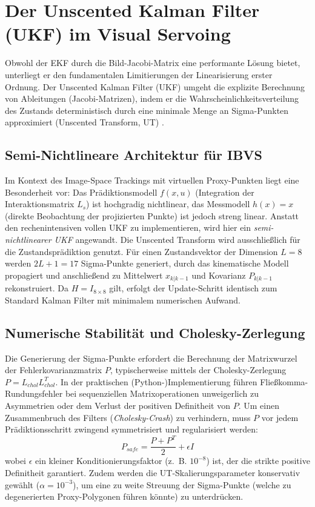 \documentclass{article}
\begin{document}
\section{Der Unscented Kalman Filter (UKF) im Visual Servoing}
\label{sec:ukf}

Obwohl der EKF durch die Bild-Jacobi-Matrix eine performante Lösung bietet, unterliegt er den fundamentalen Limitierungen der Linearisierung erster Ordnung. Der Unscented Kalman Filter (UKF) umgeht die explizite Berechnung von Ableitungen (Jacobi-Matrizen), indem er die Wahrscheinlichkeitsverteilung des Zustands deterministisch durch eine minimale Menge an Sigma-Punkten approximiert (Unscented Transform, UT) \cite{julier1997new}.




\subsection{Semi-Nichtlineare Architektur für IBVS}
Im Kontext des Image-Space Trackings mit virtuellen Proxy-Punkten liegt eine Besonderheit vor: Das Prädiktionsmodell $f(x, u)$ (Integration der Interaktionsmatrix $L_s$) ist hochgradig nichtlinear, das Messmodell $h(x) = x$ (direkte Beobachtung der projizierten Punkte) ist jedoch streng linear. 
Anstatt den rechenintensiven vollen UKF zu implementieren, wird hier ein \textit{semi-nichtlinearer UKF} \cite{wan2000unscented} angewandt. 
Die Unscented Transform wird ausschließlich für die Zustandsprädiktion genutzt. Für einen Zustandsvektor der Dimension $L=8$ werden $2L+1 = 17$ Sigma-Punkte generiert, durch das kinematische Modell propagiert und anschließend zu Mittelwert $x_{k|k-1}$ und Kovarianz $P_{k|k-1}$ rekonstruiert. 
Da $H = I_{8 \times 8}$ gilt, erfolgt der Update-Schritt identisch zum Standard Kalman Filter mit minimalem numerischen Aufwand.




\subsection{Numerische Stabilität und Cholesky-Zerlegung}
Die Generierung der Sigma-Punkte erfordert die Berechnung der Matrixwurzel der Fehlerkovarianzmatrix $P$, typischerweise mittels der Cholesky-Zerlegung $P = L_{chol} L_{chol}^T$. In der praktischen (Python-)Implementierung führen Fließkomma-Rundungsfehler bei sequenziellen Matrixoperationen unweigerlich zu Asymmetrien oder dem Verlust der positiven Definitheit von $P$.
Um einen Zusammenbruch des Filters (\textit{Cholesky-Crash}) zu verhindern, muss $P$ vor jedem Prädiktionsschritt zwingend symmetrisiert und regularisiert werden:
\begin{equation}
    P_{safe} = \frac{P + P^T}{2} + \epsilon I
\end{equation}
wobei $\epsilon$ ein kleiner Konditionierungsfaktor (z.~B. $10^{-8}$) ist, der die strikte positive Definitheit garantiert. Zudem werden die UT-Skalierungsparameter konservativ gewählt ($\alpha = 10^{-3}$), um eine zu weite Streuung der Sigma-Punkte (welche zu degenerierten Proxy-Polygonen führen könnte) zu unterdrücken.
\end{document}
